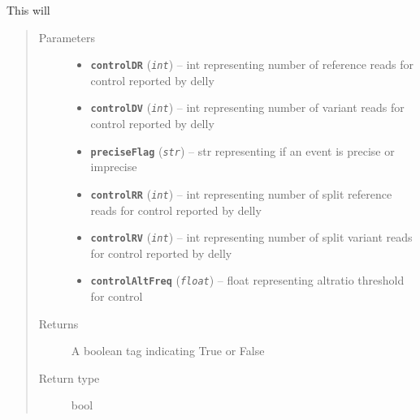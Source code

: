 \documentclass[letterpaper,10pt,english]{sphinxmanual}
\begin{document}

\begin{fulllineitems}
\label{iCallSV:iCallSV.FilterDellyCalls.GetControlFlag}
This will 
\begin{quote}\begin{description}
\item[{Parameters}] \leavevmode\begin{itemize}
\item {} 
\textbf{\texttt{controlDR}} (\emph{\texttt{int}}) -- int representing number of reference reads for control reported by delly

\item {} 
\textbf{\texttt{controlDV}} (\emph{\texttt{int}}) -- int representing number of variant reads for control reported by delly

\item {} 
\textbf{\texttt{preciseFlag}} (\emph{\texttt{str}}) -- str representing if an event is precise or imprecise

\item {} 
\textbf{\texttt{controlRR}} (\emph{\texttt{int}}) -- int representing number of split reference reads for control reported by delly

\item {} 
\textbf{\texttt{controlRV}} (\emph{\texttt{int}}) -- int representing number of split variant reads for control reported by delly

\item {} 
\textbf{\texttt{controlAltFreq}} (\emph{\texttt{float}}) -- float representing altratio threshold for control

\end{itemize}

\item[{Returns}] \leavevmode
A boolean tag indicating True or False

\item[{Return type}] \leavevmode
bool

\end{description}\end{quote}

\end{fulllineitems}
\end{document}
